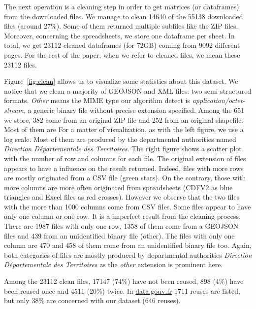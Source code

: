 \documentclass[a4paper]{article}
\begin{document}
	The next operation is a cleaning step in order to get matrices (or dataframes) from the downloaded files. We manage to clean 14640 of the 55138 downloaded files (around 27\%). Some of them returned multiple subfiles like the ZIP files. Moreover, concerning the spreadsheets, we store one dataframe per sheet. In total, we get 23112 cleaned dataframes (for 72GB) coming from 9092 different pages. For the rest of the paper, when we refer to cleaned files, we mean these 23112 files. 
	
	Figure~\ref{fig:clean} allows us to visualize some statistics about this dataset. We notice that we clean a majority of GEOJSON and XML files: two semi-structured formats. \emph{Other} means the MIME type our algorithm detect is \emph{application/octet-stream}, a generic binary file without precise extension specified. Among the 651 we store, 382 come from an original ZIP file and 252 from an original shapefile. Most of them are For a matter of visualization, as with the left figure, we use a log scale. Most of them are produced by the departmental authorities named \emph{Direction Départementale des Territoires}. The right figure shows a scatter plot with the number of row and columns for each file. The original extension of files appears to have a influence on the result returned. Indeed, files with more rows are mostly originated from a CSV file (green stars). On the contrary, those with more columns are more often originated from spreadsheets (CDFV2 as blue triangles and Excel files as red crosses). However we observe that the two files with the more than 1000 columns come from CSV files. Some files appear to have only one column or one row. It is a imperfect result from the cleaning process. There are 1987 files with only one row, 1358 of them come from a GEOJSON files and 439 from an unidentified binary file (other). The files with only one column are 470 and 458 of them come from an unidentified binary file too. Again, both categories of files are mostly produced by departmental authorities \emph{Direction Départementale des Territoires} as the \emph{other} extension is prominent here.
	
	Among the 23112 clean files, 17147 (74\%) have not been reused, 898 (4\%) have been reused once and 4511 (20\%) twice. In \href{http://www.data.gouv.fr/fr/}{data.gouv.fr} 1711 reuses are listed, but only 38\% are concerned with our dataset (646 reuses).	
	
\end{document}
